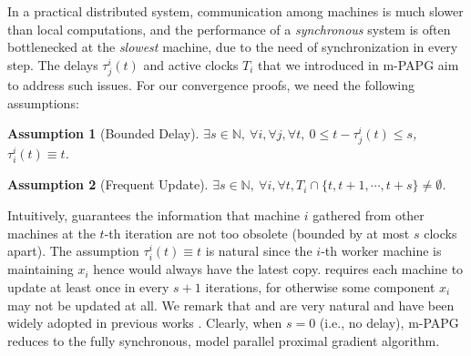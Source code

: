 \documentclass[leqno,onefignum,onetabnum]{siamart0516}
\newtheorem{assum}{Assumption}
\newcommand{\ie}{{i.e.}\xspace}
\newcommand{\mspg}{\textsf{m-PAPG}\xspace}
\begin{document}
In a practical distributed system, communication among machines is much slower than local computations, and the performance of a \emph{synchronous} system is often bottlenecked at the \emph{slowest} machine, due to the need of synchronization in every step.  
The delays $\tau^i_j(t)$ and active clocks $T_i$ that we introduced in \mspg aim to address such issues. For our convergence proofs, we need the following assumptions:
\begin{assum}[Bounded Delay]\label{assum:delay}
$\exists s \in \mathds{N}, ~\forall i, \forall j, \forall t, ~0 \leq t-\tau_j^i(t) \leq s$, $\tau_i^i(t) \equiv t$.
\end{assum}
\begin{assum}[Frequent Update]\label{assum:skip}
$\exists s \in \mathds{N}, ~\forall i, \forall t, T_i \cap \{t, t+1, \cdots, t+s\} \ne \emptyset$.
\end{assum}


Intuitively,  guarantees the information that machine $i$ gathered from other machines at the $t$-th iteration are not too obsolete (bounded by at most $s$ clocks apart). The assumption $\tau_i^i(t) \equiv t$ is natural since the $i$-th worker machine is maintaining $x_i$ hence would always have the latest copy.
requires each machine to update at least once in every $s+1$ iterations, for otherwise some component $x_i$ may not be updated at all. We remark that  and  are very natural and have been widely adopted in previous works \cite{Baudet78,BT_parallel,ChazanMiranker69,delay_pga_linear,Tseng_linear_PAA}. 
Clearly, when $s = 0$ (\ie, no delay), \mspg reduces to the fully synchronous, model parallel proximal gradient algorithm. 
\end{document}
